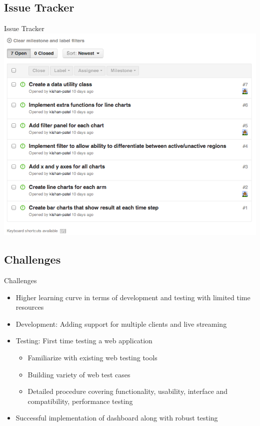 \documentclass{beamer}
\begin{document}
\subsection{Issue Tracker}
\begin{frame}{Issue Tracker}
\includegraphics[scale=0.25]{gitissues.png}
\end{frame}

\subsection{Challenges}
\begin{frame}{Challenges}
\begin{itemize}
\item Higher learning curve in terms of development and testing with limited time resources
\item Development:  Adding support for multiple clients and live streaming
\item Testing: First time testing a web application 
	\begin{itemize}
		\item Familiarize with existing web testing tools
		\item Building variety of web test cases
		\item Detailed procedure covering functionality, usability, interface and compatibility, performance testing
	\end{itemize}
\item Successful implementation of dashboard along with robust testing
\end{itemize}
\end{frame}
\end{document}
